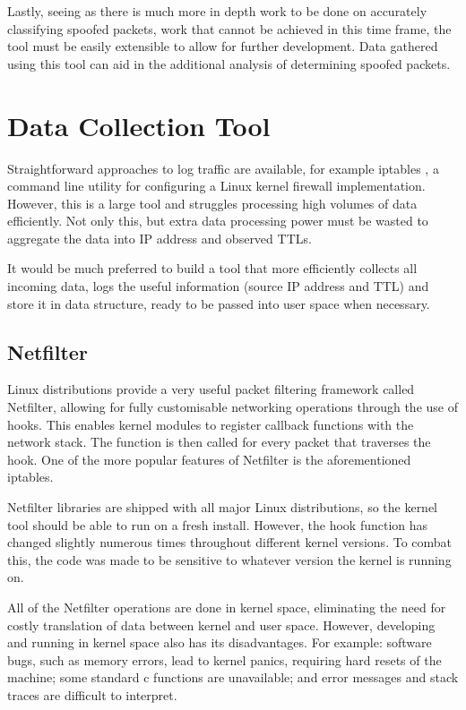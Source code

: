 \documentclass[12pt,twoside]{article}
\begin{document}
Lastly, seeing as there is much more in depth work to be done on accurately classifying spoofed packets, work that cannot be achieved in this time frame, the tool must be easily extensible to allow for further development. Data gathered using this tool can aid in the additional analysis of determining spoofed packets. 

\section{Data Collection Tool} \label{kernel_tool}

Straightforward approaches to log traffic are available, for example iptables \cite{iptables}, a command line utility for configuring a Linux kernel firewall implementation. However, this is a large tool and struggles processing high volumes of data efficiently. Not only this, but extra data processing power must be wasted to aggregate the data into IP address and observed TTLs.

It would be much preferred to build a tool that more efficiently collects all incoming data, logs the useful information (source IP address and TTL) and store it in data structure, ready to be passed into user space when necessary.

\subsection{Netfilter \cite{netfilter}}
Linux distributions provide a very useful packet filtering framework called Netfilter, allowing for fully customisable networking operations through the use of hooks. This enables kernel modules to register callback functions with the network stack. The function is then called for every packet that traverses the hook. One of the more popular features of Netfilter is the aforementioned iptables.

Netfilter libraries are shipped with all major Linux distributions, so the kernel tool should be able to run on a fresh install. However, the hook function has changed slightly numerous times throughout different kernel versions. To combat this, the code was made to be sensitive to whatever version the kernel is running on.

All of the Netfilter operations are done in kernel space, eliminating the need for costly translation of data between kernel and user space. However, developing and running in kernel space also has its disadvantages. For example: software bugs, such as memory errors, lead to kernel panics, requiring hard resets of the machine; some standard c functions are unavailable; and error messages and stack traces are difficult to interpret.
\end{document}
